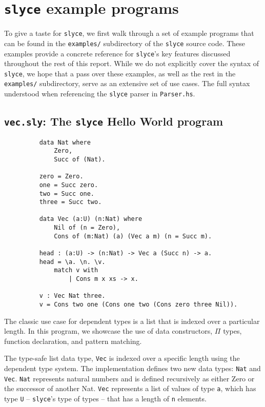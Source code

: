 \section{\texttt{slyce} example programs}
To give a taste for \texttt{slyce}, we first walk through a set of example programs that can be found in the \texttt{examples/} subdirectory of the \texttt{slyce} source code.
These examples provide a concrete reference for \texttt{slyce}'s key features discussed throughout the rest of this report.
While we do not explicitly cover the syntax of \texttt{slyce}, we hope that a pass over these examples, as well as the rest in the \texttt{examples/} subdirectory, serve as an extensive set of use cases.
The full syntax understood when referencing the \texttt{slyce} parser in \texttt{Parser.hs}.
 
\subsection{\texttt{vec.sly}: The \texttt{slyce} Hello World program}
\begin{figure}[h!]
\begin{lstlisting}
    data Nat where
        Zero,
        Succ of (Nat).

    zero = Zero.
    one = Succ zero.
    two = Succ one.
    three = Succ two.

    data Vec (a:U) (n:Nat) where
        Nil of (n = Zero),
        Cons of (m:Nat) (a) (Vec a m) (n = Succ m).

    head : (a:U) -> (n:Nat) -> Vec a (Succ n) -> a.
    head = \a. \n. \v.
        match v with
            | Cons m x xs -> x.

    v : Vec Nat three.
    v = Cons two one (Cons one two (Cons zero three Nil)).
\end{lstlisting}
\end{figure}

The classic use case for dependent types is a list that is indexed over a particular length.
In this program, we showcase the use of data constructors, $\Pi$ types, function declaration, and pattern matching.

The type-safe list data type, \texttt{Vec} is indexed over a specific length using the dependent type system. 
The implementation defines two new data types: \texttt{Nat} and \texttt{Vec}. 
\texttt{Nat} represents natural numbers and is defined recursively as either Zero or the successor of another Nat. 
\texttt{Vec} represents a list of values of type \texttt{a}, which has type \texttt{U} -- \texttt{slyce}'s type of types -- that has a length of \texttt{n} elements.

